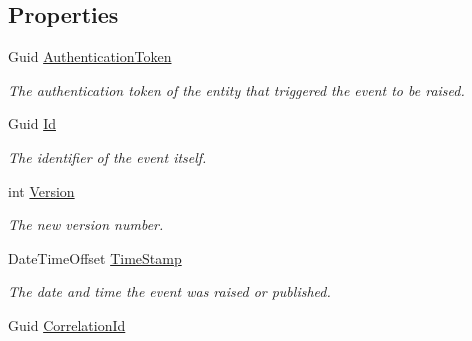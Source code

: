\subsection*{Properties}
\begin{DoxyCompactItemize}
\item 
Guid \hyperlink{classCqrs_1_1Azure_1_1ServiceBus_1_1Tests_1_1Unit_1_1TestEvent_a3cc3380a0c4a9dce42f2b306a9b6023b_a3cc3380a0c4a9dce42f2b306a9b6023b}{Authentication\+Token}
\begin{DoxyCompactList}\small\item\em The authentication token of the entity that triggered the event to be raised. \end{DoxyCompactList}\item 
Guid \hyperlink{classCqrs_1_1Azure_1_1ServiceBus_1_1Tests_1_1Unit_1_1TestEvent_a5c67228f956f56289a57d4c08e4b611e_a5c67228f956f56289a57d4c08e4b611e}{Id}
\begin{DoxyCompactList}\small\item\em The identifier of the event itself. \end{DoxyCompactList}\item 
int \hyperlink{classCqrs_1_1Azure_1_1ServiceBus_1_1Tests_1_1Unit_1_1TestEvent_aa7a01fed424a068f05d38cdd70ad8890_aa7a01fed424a068f05d38cdd70ad8890}{Version}
\begin{DoxyCompactList}\small\item\em The new version number. \end{DoxyCompactList}\item 
Date\+Time\+Offset \hyperlink{classCqrs_1_1Azure_1_1ServiceBus_1_1Tests_1_1Unit_1_1TestEvent_ad45c3e187502e0c8e367511900c8a808_ad45c3e187502e0c8e367511900c8a808}{Time\+Stamp}
\begin{DoxyCompactList}\small\item\em The date and time the event was raised or published. \end{DoxyCompactList}\item 
Guid \hyperlink{classCqrs_1_1Azure_1_1ServiceBus_1_1Tests_1_1Unit_1_1TestEvent_a713230eebc1d248dd7245b80553abac4_a713230eebc1d248dd7245b80553abac4}{Correlation\+Id}

\end{DoxyCompactItemize}
